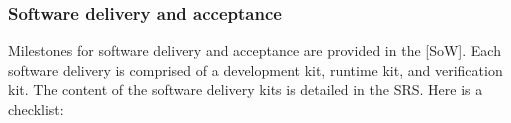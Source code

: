 \subsubsection{Software delivery and acceptance}
\label{subsub:software-delivery-and-acceptance}

%
%
%
%
%
%
%
%
%
%
%

Milestones for software delivery and acceptance are provided in the [SoW]. Each software delivery is comprised of a development kit, runtime kit, and verification kit. The content of the software delivery kits is detailed in the SRS. Here is a checklist:

